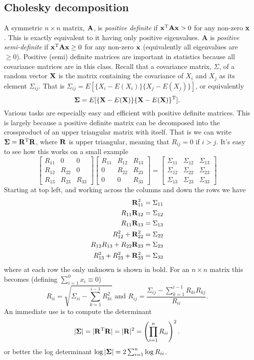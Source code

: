 \documentclass[10pt] {article}
\newcommand{\X}{{\vf X}}
\newcommand{\vf}{\bf} %
\newcommand{\ts}{^{\rm T}}
\newcommand{\bmat}[1]{\left [ \begin{array}{#1}}
\newcommand{\emat}{\end{array}\right ]}
\theoremstyle{definition}
\begin{document}
\subsection{Cholesky decomposition}

A symmetric $n \times n$ matrix, $\bf A$, is {\em positive definite} if ${\bf x}\ts {\bf Ax} > 0$ for any non-zero $\bf x$. This is exactly equivalent to it having only positive eigenvalues. {\bf A} is {\em positive semi-definite} if  ${\bf x}\ts {\bf Ax} \ge 0$ for any non-zero $\bf x$ (equivalently all eigenvalues are $\ge 0$). Positive (semi) definite matrices are important in statistics because all covariance matrices are in this class. Recall that a covariance matrix, $\Sigma$, of a random vector $\bf X$ is the matrix containing the covariance of $X_i$ and $X_j$ as its element $\Sigma_{ij}$. That is $\Sigma_{ij} = E[\{X_i - E(X_i)\}\{X_j - E(X_j)\}]$, or equivalently 
$$
{\bm \Sigma} = E[\{\X - E(\X)\}\{\X-E(\X)\}\ts].
$$
Various tasks are especially easy and efficient with positive definite matrices. This is largely because a positive definite matrix can be decomposed into the crossproduct of an upper triangular matrix with itself. That is we can write ${\bm \Sigma} = {\bf R}\ts{\bf R}$, where $\bf R$ is upper triangular, meaning that $R_{ij}=0$ if $i>j$. It's easy to see how this works on a small example
$$
\bmat{ccc} 
R_{11} & 0 & 0 \\ R_{12} & R_{22} & 0 \\ R_{13} & R_{23} & R_{33}  
\emat \bmat{ccc} 
R_{11} & R_{12} & R_{13} \\
0 & R_{22} & R_{23} \\
0 & 0 & R_{33}
\emat = \bmat{ccc} 
\Sigma_{11} & \Sigma_{12} & \Sigma_{13} \\
\Sigma_{12} & \Sigma_{22} & \Sigma_{23} \\
\Sigma_{13} & \Sigma_{23} & \Sigma_{33}
\emat
$$
Starting at top left, and working across the columns and down the rows we have
\begin{align*}
{\bf R}_{11}^2 &= \Sigma_{11}\\
R_{11}{\bf R}_{12} &= \Sigma_{12}\\
R_{11}{\bf R}_{13} &= \Sigma_{13}\\
R_{12}^2 + {\bf R}_{22}^2 &= \Sigma_{22}\\
R_{12} R_{13} + R_{22}{\bf R}_{23} &= \Sigma_{23}\\
R_{13}^2 + R_{23}^2 + {\bf R}_{33}^2 &= \Sigma_{33} 
\end{align*}
where at each row the only unknown is shown in bold. For an $n\times n$ matrix this becomes (defining $\sum_{i=1}^0 x_i \equiv 0$)
$$
R_{ii} = \sqrt{\Sigma_{ii} - \sum_{k=1}^{i-1} R_{ki}^2} \text{    and    }
R_{ij} = \frac{\Sigma_{ij} - \sum_{k=1}^{i-1} R_{ki}R_{kj}}{R_{ii}}.
$$
An immediate use is to compute the determinant 
$$
|{\bf \Sigma}| = |{\bf R}\ts{\bf R}| = |{\bf R}|^2 = \left ( \prod_{i=1}^n R_{ii} \right )^2.
$$
or better the log determinant $\log |{\bf \Sigma}| = 2 \sum_{i=1}^n \log R_{ii}$. 
\end{document}
